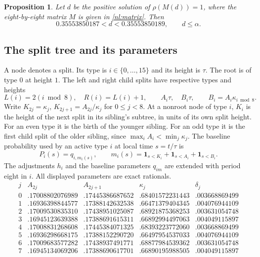 \documentclass[11pt]{article}
\newtheorem{proposition}[theorem]{Proposition}
\numberwithin{equation}{section}
\newcommand{\one}{\mathbf 1}
\begin{document}
\begin{proposition}\label{nl:result}
Let $d$ be the positive solution of $\rho(M(d))=1$, where the
eight-by-eight matrix $M$ is given in \eqref{nl:matrix}. Then
\[
      0.35553850187<d<0.35553850189,\qquad d\le\alpha .
\]
\end{proposition}

\subsection{The split tree and its parameters}

A node denotes a split. Its type is $i\in\{0,\ldots,15\}$ and its
height is $\tau$. The root is of type $0$ at height $1$. The left
and right child splits have respective types and heights
\[
 L(i)=2(i\bmod 8),\quad R(i)=L(i)+1,\qquad
 A_i\tau,\quad B_i\tau,\qquad B_i=A_i\kappa_{i\bmod8}.
\]
Write $K_{2j}=\kappa_j$, $K_{2j+1}=A_{2j}/\kappa_j$ for $0\le j<8$.
At a nonroot node of type $i$, $K_i$ is the height of the next
split in its sibling's subtree, in units of its own split height. For an even type it is
the birth of the younger sibling. For an odd type it is the first
child split of the older sibling, since $\max_i A_i<\min_j\kappa_j$.
The baseline probability used by an active type $i$ at local time
$s=t/\tau$ is
\[
 P_i(s)=q_{i,m_i(s)},\qquad
 m_i(s)=\one_{s<K_i}+\one_{s<A_i}+\one_{s<B_i}.
\]
The adjustments $h_i$ and the baseline parameters $q_{im}$ are
extended with period eight in $i$.
All displayed parameters are exact rationals.
\[
\begin{array}{c|rrrr}
j&A_{2j}&A_{2j+1}&\kappa_j&\delta_j\\ \hline
0&.17008802076989&.17445386687652&.68401572231443&.003668869499\\
1&.16936398844577&.17388142632538&.66471379404345&.004076944109\\
2&.17009530835310&.17438951025087&.68921875368253&.003631054748\\
3&.16945123639388&.17388691615311&.66892994497063&.004049115897\\
4&.17008831268608&.17445384071325&.68393223772060&.003668869499\\
5&.16936298668175&.17388152290720&.66497954537033&.004076944109\\
6&.17009683577282&.17438937491771&.68877984539362&.003631054748\\
7&.16945134069206&.17388690617701&.66890195988505&.004049115897
\end{array}
\]
\end{document}
